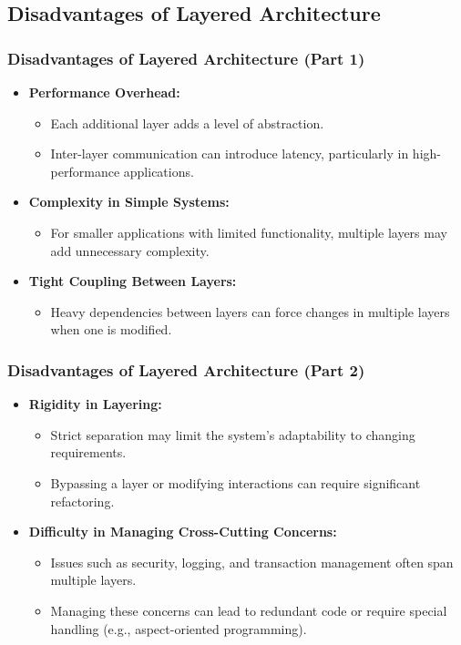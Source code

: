 \documentclass[aspectratio=169, table]{beamer}
\begin{document}
\subsection{Disadvantages of Layered Architecture}

\begin{frame}
	\frametitle{Disadvantages of Layered Architecture (Part 1)}
	\begin{itemize}
		\item \textbf{Performance Overhead:}
		\begin{itemize}
			\item Each additional layer adds a level of abstraction.
			\item Inter-layer communication can introduce latency, particularly in high-performance applications.
		\end{itemize}
		\item \textbf{Complexity in Simple Systems:}
		\begin{itemize}
			\item For smaller applications with limited functionality, multiple layers may add unnecessary complexity.
		\end{itemize}
		\item \textbf{Tight Coupling Between Layers:}
		\begin{itemize}
			\item Heavy dependencies between layers can force changes in multiple layers when one is modified.
		\end{itemize}
	\end{itemize}
\end{frame}

\begin{frame}
	\frametitle{Disadvantages of Layered Architecture (Part 2)}
	\begin{itemize}
		\item \textbf{Rigidity in Layering:}
		\begin{itemize}
			\item Strict separation may limit the system's adaptability to changing requirements.
			\item Bypassing a layer or modifying interactions can require significant refactoring.
		\end{itemize}
		\item \textbf{Difficulty in Managing Cross-Cutting Concerns:}
		\begin{itemize}
			\item Issues such as security, logging, and transaction management often span multiple layers.
			\item Managing these concerns can lead to redundant code or require special handling (e.g., aspect-oriented programming).
		\end{itemize}
	\end{itemize}
\end{frame}
\end{document}
